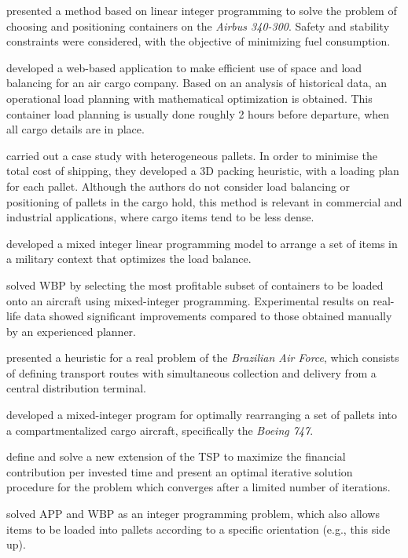 \documentclass[preprint,authoryear]{elsarticle}
\begin{document}
\cite{MongeauBes2003} presented a method based on linear integer programming to solve the problem of choosing and positioning containers on the {\it Airbus 340-300}. Safety and stability constraints were considered, with the objective of minimizing fuel consumption.

\cite{fok2004optimizing} developed a web-based application to make efficient use of space and load balancing for an air cargo company. Based on an analysis of historical data, an operational load planning with mathematical optimization is obtained. This container load planning is usually done roughly 2 hours before departure, when all cargo details are in place.

\cite{Chan2006} carried out a case study with heterogeneous pallets. In order to minimise the total cost of shipping, they developed a 3D packing heuristic, with a loading plan for each pallet. Although the authors do not consider load balancing or positioning of pallets in the cargo hold, this method is relevant in commercial and industrial applications, where cargo items tend to be less dense.

\cite{KaluznyBohdanL2009Oalb} developed a mixed integer linear programming model to arrange a set of items in a military context that optimizes the load balance.

\cite{Verstichel2011} solved WBP by selecting the most profitable subset of containers to be loaded onto an aircraft using mixed-integer programming. Experimental results on real-life data showed significant improvements compared to those obtained manually by an experienced planner.

\cite{MesquitaCunha2011} presented a heuristic for a real problem of the {\it Brazilian Air Force}, which consists of defining transport routes with simultaneous collection and delivery from a central distribution terminal.

\cite{Limbourg2012} developed a mixed-integer program for optimally rearranging a set of pallets into a compartmentalized cargo aircraft, specifically the {\it Boeing 747}.

\cite{kaspi2019} define and solve a new extension of the TSP to maximize the financial contribution per invested time and present an optimal iterative solution procedure for the problem which converges after a limited number of iterations.

\cite{RoesenerHall2014} solved APP and WBP as an integer programming problem, which also allows items to be loaded into pallets according to a specific orientation (e.g., this side up).
\end{document}
